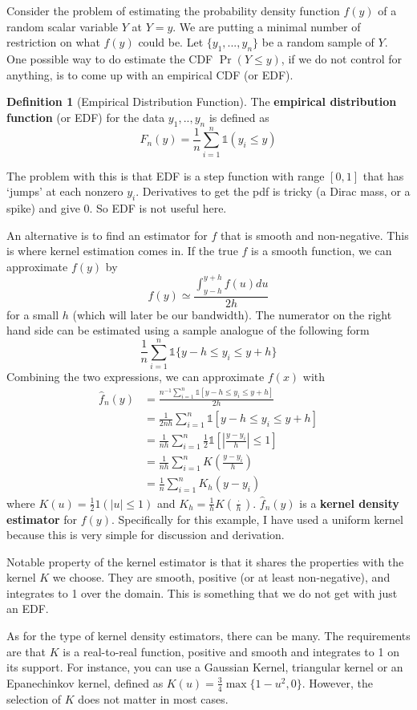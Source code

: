 \documentclass[12pt]{article}
\theoremstyle{definition}
\newtheorem{definition}{Definition}[section]
\theoremstyle{property}
\theoremstyle{assumption}
\theoremstyle{example}
\theoremstyle{comment}
\begin{document}
Consider the problem of estimating the probability density function $f(y)$ of a random scalar variable $Y$ at $Y=y$. We are putting a minimal number of restriction on what $f(y)$ could be. Let $\{y_1,...,y_n\}$ be a random sample of $Y$. One possible way to do estimate the CDF $\Pr(Y\leq y)$, if we do not control for anything, is to come up with an empirical CDF (or EDF). 

\begin{mdframed}[backgroundcolor=blue!5] 
\begin{definition}[Empirical Distribution Function] The \textbf{empirical distribution function} (or EDF) for the data $y_1,..,y_n$ is defined as
\[
F_n(y) = \frac{1}{n}\sum_{i=1}^n \mathbb{1}(y_i\leq y)
\]
\end{definition}
\end{mdframed} 
The problem with this is that EDF is a step function with range $[0,1]$ that has `jumps' at each nonzero $y_i$. Derivatives to get the pdf is tricky (a Dirac mass, or a spike) and give 0. So EDF is not useful here. 

An alternative is to find an estimator for $f$ that is smooth and non-negative. This is where kernel estimation comes in. If the true $f$ is a smooth function, we can approximate $f(y)$ by
\[
f(y)\simeq \frac{\int_{y-h}^{y+h}f(u)du}{2h}
\]
for a small $h$ (which will later be our bandwidth). The numerator on the right hand side can be estimated using a sample analogue of the following form
\[
\frac{1}{n}\sum_{i=1}^n \mathbb{1}\{y-h\leq y_i \leq y+h \}
\]
Combining the two expressions, we can approximate $f(x)$ with
\footnotesize{\begin{align*}
\hat{f}_n(y)&=\frac{n^{-1}\sum_{i=1}^n \mathbb{1}[y-h\leq y_i \leq y+h]}{2h} \\
&=\frac{1}{2nh}\sum_{i=1}^n \mathbb{1}[y-h\leq y_i \leq y+h]\\
&=\frac{1}{nh}\sum_{i=1}^n \frac{1}{2}\mathbb{1}\left[\left|\frac{y-y_i}{h}\right| \leq 1\right]\\
&=\frac{1}{nh}\sum_{i=1}^n K\left(\frac{y-y_i}{h}\right)\\
&=\frac{1}{n}\sum_{i=1}^n K_h(y-y_i)
\end{align*}}\normalsize
where $K(u)=\frac{1}{2}1(|u|\leq 1)$ and $K_h = \frac{1}{h}K\left(\frac{\cdot}{h}\right)$. $\hat{f}_n(y)$ is a \textbf{kernel density estimator} for $f(y)$. Specifically for this example, I have used a uniform kernel because this is very simple for discussion and derivation. \par
Notable property of the kernel estimator is that it shares the properties with the kernel $K$ we choose. They are smooth, positive (or at least non-negative), and integrates to 1 over the domain. This is something that we do not get with just an EDF.  \par
As for the type of kernel density estimators, there can be many. The requirements are that $K$ is a real-to-real function, positive and smooth and integrates to 1 on its support. For instance, you can use a Gaussian Kernel, triangular kernel or an Epanechinkov kernel, defined as $K(u)=\frac{3}{4}\max\{1-u^2,0\}$. However, the selection of $K$ does not matter in most cases. 
\end{document}
